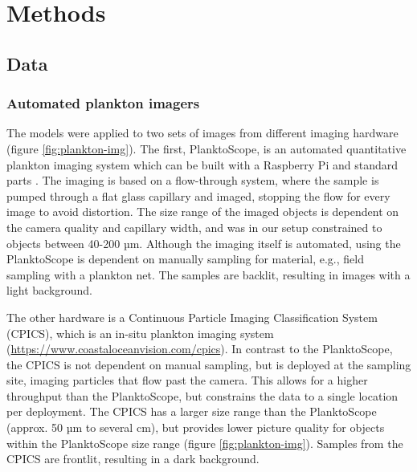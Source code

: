 \section{Methods}\label{sec:methods}
\subsection{Data} \label{subsec:data}

\subsubsection{Automated plankton imagers}

The models were applied to two sets of images from different imaging hardware (figure \ref{fig:plankton-img}). The first, PlanktoScope, is an automated quantitative plankton imaging system which can be built with a Raspberry Pi and standard parts \cite{pollina2022:planktoscope}. The imaging is based on a flow-through system, where the sample is pumped through a flat glass capillary and imaged, stopping the flow for every image to avoid distortion. The size range of the imaged objects is dependent on the camera quality and capillary width, and was in our setup constrained to objects between 40-200 µm. Although the imaging itself is automated, using the PlanktoScope is dependent on manually sampling for material, e.g., field sampling with a plankton net. The samples are backlit, resulting in images with a light background.

The other hardware is a Continuous Particle Imaging Classification System (CPICS), which is an in-situ plankton imaging system (\hyperlink{https://www.coastaloceanvision.com/cpics}{https://www.coastaloceanvision.com/cpics}). In contrast to the PlanktoScope, the CPICS is not dependent on manual sampling, but is deployed at the sampling site, imaging particles that flow past the camera. This allows for a higher throughput than the PlanktoScope, but constrains the data to a single location per deployment. The CPICS has a larger size range than the PlanktoScope (approx. 50 µm to several cm), but provides lower picture quality for objects within the PlanktoScope size range (figure \ref{fig:plankton-img}). Samples from the CPICS are frontlit, resulting in a dark background.


